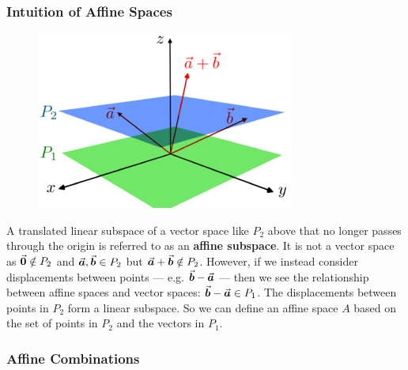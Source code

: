 \documentclass[MathsNotesBase.tex]{subfiles}
\begin{document}
{	\pagebreak
	\subsubsection{Intuition of Affine Spaces}
	\begin{figure}
		\includegraphics[width=0.9\linewidth]{resources/img/320px-Affine_space_R3.png} 
		\label{fig:affine_space_schematic}
	\end{figure}
	A translated linear subspace of a vector space like $P_2$ above that no longer passes through the origin is referred to as an \textbf{affine subspace}. It is not a vector space as ${ \vec{\bm{0}} \notin P_2 }$ and ${ \vec{\bm{a}},\vec{\bm{b}} \in P_2 }$ but ${ \vec{\bm{a}} + \vec{\bm{b}} \notin P_2 }$. 
	However, if we instead consider displacements between points --- e.g. ${ \vec{\bm{b}} - \vec{\bm{a}} }$ --- then we see the relationship between affine spaces and vector spaces: ${ \vec{\bm{b}} - \vec{\bm{a}} \in P_1 }$. The displacements between points in $P_2$ form a linear subspace. So we can define an affine space $A$ based on the set of points in $P_2$ and the vectors in $P_1$.
	

	\bigskip
	\subsubsection{Affine Combinations}
	
}
\end{document}

